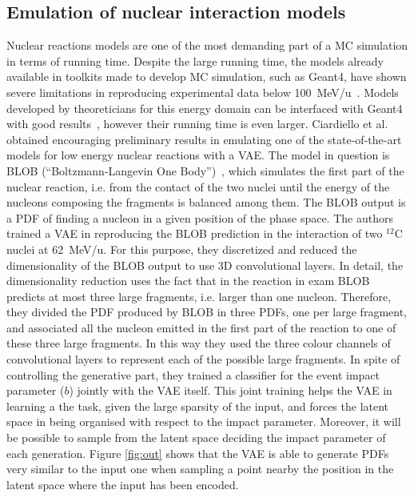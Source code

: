 \subsection{Emulation of nuclear interaction models}
Nuclear reactions models are one of the most demanding part of a MC simulation in terms of running time. Despite the large running time, the models already available in toolkits made to develop MC simulation, such as Geant4, have shown severe limitations in reproducing experimental data below 100~MeV/u~\cite{Arce2021}. Models developed by theoreticians for this energy domain can be interfaced with Geant4 with good results~\cite{Mancini-Terracciano2019}, however their running time is even larger. Ciardiello et al.~\cite{Ciardiello2020} obtained encouraging preliminary results 
in emulating one of the state-of-the-art models for low energy nuclear reactions with a VAE. The model in question is BLOB (``Boltzmann-Langevin One Body'')~\cite{Napolitani2013}, which simulates the first part of the nuclear reaction, i.e. from the contact of the two nuclei until the energy of the nucleons composing the fragments is balanced among them. The BLOB output is a PDF of finding a nucleon in a given position of the phase space. The authors trained a VAE in reproducing the BLOB prediction in the interaction of two $^{12}$C nuclei at 62~MeV/u. For this purpose, they discretized and reduced the dimensionality of the BLOB output to use 3D convolutional layers. In detail, the dimensionality reduction uses the fact that in the reaction in exam BLOB predicts at most three large fragments, i.e. larger than one nucleon. Therefore, they divided the PDF produced by BLOB in three PDFs, one per large fragment, and associated all the nucleon emitted in the first part of the reaction to one of these three large fragments. In this way they used the three colour channels of convolutional layers to represent each of the possible large fragments. In spite of controlling the generative part, they trained a classifier for the event impact parameter ($b$) jointly with the VAE itself. This joint training helps the VAE in learning a the task, given the large sparsity of the input, and forces the latent space in being organised with respect to the impact parameter. Moreover, it will be possible to sample from the latent space deciding the impact parameter of each generation.
Figure \ref{fig:out} shows that the VAE is able to generate PDFs very similar to the input one when sampling a point nearby the position in the latent space where the input has been encoded.

